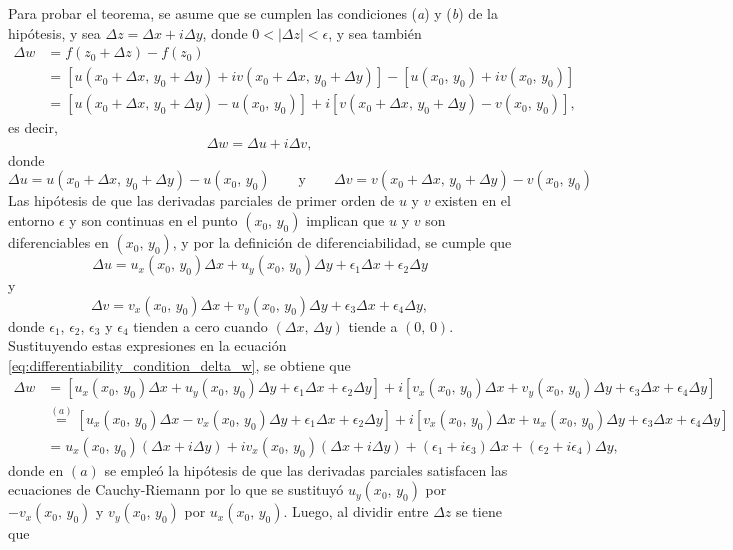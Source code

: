 \documentclass[a4paper]{report}
\begin{document}
\medskip 
Para probar el teorema, se asume que se cumplen las condiciones (\textit{a}) y (\textit{b}) de la hipótesis, y sea \(\Delta z=\Delta x+i\Delta y\), donde \(0<|\Delta z|<\epsilon\), y sea también
\begin{align*}
 \Delta w&=f(z_0+\Delta z)-f(z_0)\\
  &=[u(x_0+\Delta x,\,y_0+\Delta y)+iv(x_0+\Delta x,\,y_0+\Delta y)]-[u(x_0,\,y_0)+iv(x_0,\,y_0)]\\
  &=[u(x_0+\Delta x,\,y_0+\Delta y)-u(x_0,\,y_0)]+i[v(x_0+\Delta x,\,y_0+\Delta y)-v(x_0,\,y_0)],
\end{align*}
es decir,
\begin{equation}\label{eq:differentiability_condition_delta_w}
 \Delta w=\Delta u+i\Delta v,
\end{equation}
donde 
\[
 \Delta u=u(x_0+\Delta x,\,y_0+\Delta y)-u(x_0,\,y_0)
 \qquad\textrm{y}\qquad
 \Delta v=v(x_0+\Delta x,\,y_0+\Delta y)-v(x_0,\,y_0)
\]
Las hipótesis de que las derivadas parciales de primer orden de \(u\) y \(v\) existen en el entorno \(\epsilon\) y son continuas en el punto \((x_0,\,y_0)\) implican que \(u\) y \(v\) son diferenciables en \((x_0,\,y_0)\), y por la definición de diferenciabilidad, se cumple que 
\[
 \Delta u=u_x(x_0,\,y_0)\Delta x+u_y(x_0,\,y_0)\Delta y+\epsilon_1\Delta x+\epsilon_2\Delta y
\]
y
\[
 \Delta v=v_x(x_0,\,y_0)\Delta x+v_y(x_0,\,y_0)\Delta y+\epsilon_3\Delta x+\epsilon_4\Delta y,
\]
donde \(\epsilon_1\), \(\epsilon_2\), \(\epsilon_3\) y \(\epsilon_4\) tienden a cero cuando \((\Delta x,\,\Delta y)\) tiende a \((0,\,0)\). Sustituyendo estas expresiones en la ecuación \ref{eq:differentiability_condition_delta_w}, se obtiene que 
\begin{align*}
 \Delta w&=[u_x(x_0,\,y_0)\Delta x+u_y(x_0,\,y_0)\Delta y+\epsilon_1\Delta x+\epsilon_2\Delta y]
   +i[v_x(x_0,\,y_0)\Delta x+v_y(x_0,\,y_0)\Delta y+\epsilon_3\Delta x+\epsilon_4\Delta y]\\
   &\overset{(a)}{=}[u_x(x_0,\,y_0)\Delta x-v_x(x_0,\,y_0)\Delta y+\epsilon_1\Delta x+\epsilon_2\Delta y]
   +i[v_x(x_0,\,y_0)\Delta x+u_x(x_0,\,y_0)\Delta y+\epsilon_3\Delta x+\epsilon_4\Delta y]\\
   &=u_x(x_0,\,y_0)(\Delta x+i\Delta y)+iv_x(x_0,\,y_0)(\Delta x+i\Delta y)+(\epsilon_1+i\epsilon_3)\Delta x+(\epsilon_2+i\epsilon_4)\Delta y,
\end{align*}
donde en \((a)\) se empleó la hipótesis de que las derivadas parciales satisfacen las ecuaciones de Cauchy-Riemann por lo que se sustituyó \(u_y(x_0,\,y_0)\) por \(-v_x(x_0,\,y_0)\) y \(v_y(x_0,\,y_0)\) por \(u_x(x_0,\,y_0)\). Luego, al dividir entre \(\Delta z\) se tiene que 
\end{document}
